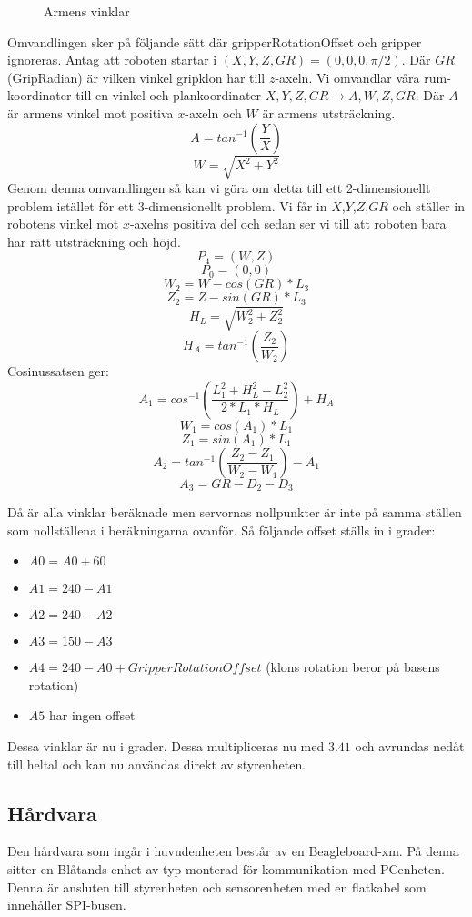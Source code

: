 \begin{figure}[h!]
    \centerline{}
    \caption{Armens vinklar}
\end{figure}

Omvandlingen sker på följande sätt där gripperRotationOffset och gripper ignoreras. Antag att roboten startar i $(X,Y,Z,GR)=(0,0,0,\pi/2)$.
Där $GR$(GripRadian) är vilken vinkel gripklon har till $z$-axeln.\newline
Vi omvandlar våra rum-koordinater till en vinkel och plankoordinater $X,Y,Z,GR\rightarrow A,W,Z,GR$. Där $A$ är armens vinkel mot positiva $x$-axeln och $W$ är armens utsträckning.
$$A=tan^{-1}(\dfrac{Y}{X}) $$
$$W=\sqrt{X^2+Y^2}$$
Genom denna omvandlingen så kan vi göra om detta till ett 2-dimensionellt problem istället för ett 3-dimensionellt problem. Vi får in $X$,$Y$,$Z$,$GR$ och ställer in robotens vinkel mot $x$-axelns positiva del och sedan ser vi till att roboten bara har rätt utsträckning och höjd.
$$P_4=(W,Z)$$
$$P_0=(0,0)$$
$$W_2=W-cos(GR)*L_3$$
$$Z_2=Z-sin(GR)*L_3$$
$$H_L=\sqrt{W_2^2+Z_2^2}$$
$$H_A=tan^{-1}(\dfrac{Z_2}{W_2})$$
Cosinussatsen ger:
$$A_1=cos^{-1}(\dfrac{L_1^2+H_L^2-L_2^2}{2*L_1*H_L})+H_A$$
$$W_1=cos(A_1)*L_1$$
$$Z_1=sin(A_1)*L_1$$
$$A_2=tan^{-1}(\dfrac{Z_2-Z_1}{W_2-W_1})-A_1$$
$$A_3=GR-D_2-D_3$$

Då är alla vinklar beräknade men servornas nollpunkter är inte på samma ställen som nollställena i beräkningarna ovanför. Så följande offset ställs in i grader:
\begin{itemize}
\item $A0=A0+60$
\item $A1=240-A1$
\item $A2=240-A2$
\item $A3=150-A3$
\item $A4=240-A0+GripperRotationOffset$ (klons rotation beror på basens rotation)
\item $A5$ har ingen offset
\end{itemize}
Dessa vinklar är nu i grader. Dessa multipliceras nu med $3.41$  och avrundas nedåt till heltal och kan nu användas direkt av styrenheten.
\subsection{Hårdvara}
Den hårdvara som ingår i huvudenheten består av en Beagleboard-xm. På denna sitter en Blåtands-enhet av typ  monterad för kommunikation med PCenheten. Denna är ansluten till styrenheten och sensorenheten med en flatkabel som innehåller SPI-busen.

